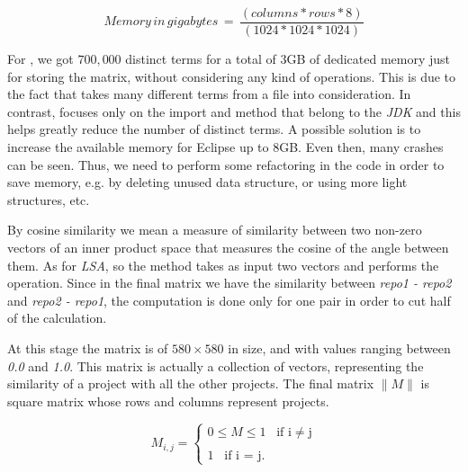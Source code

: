 \begin{equation}
Memory\,in\,gigabytes\,=\,\frac{(columns*rows*8)}{(1024*1024*1024)}
\end{equation}


For \MUDABlue, we got $700,000$ distinct terms for a total of 3GB of dedicated memory just for storing the matrix, without considering any kind of operations. This is due to the fact that \MUDABlue takes many different terms from a file into consideration. In contrast, \CLAN focuses only on the import and method that belong to the \emph{JDK} and this helps greatly reduce the number of distinct terms. A possible solution is to increase the available memory for Eclipse up to 8GB. Even then, many crashes can be seen. Thus, we need to perform some refactoring in the code in order to save memory, e.g. by deleting unused data structure, or using more light structures, etc.



By cosine similarity we mean a measure of similarity between two non-zero vectors of an inner product space that measures the cosine of the angle between them. As for \emph{LSA}, so the method takes as input two vectors and performs the operation. Since in the final matrix we have the similarity between \emph{repo1 - repo2} and \emph{repo2 - repo1}, the computation is done only for one pair in order to cut half of the calculation.


At this stage the matrix is of $580 \times 580$ in size, and with values ranging between \emph{0.0} and \emph{1.0}. This matrix is actually a collection of vectors, representing the similarity of a project with all the other projects.
The final matrix $\| M \|$ is square matrix whose rows and columns represent projects. %

\begin{equation}
  M_{i,j}=\begin{cases}
    0\leq M \leq 1 \; \; \; \text{if i} \neq \text{j}\\
    \\
    1 \; \; \; \text{if i = j}.
  \end{cases}
\end{equation}\\

